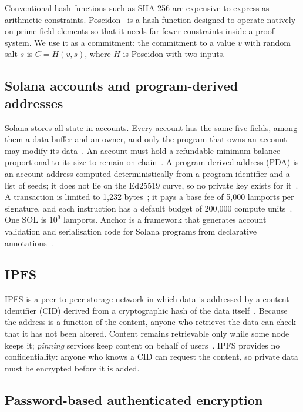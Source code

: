 Conventional hash functions such as SHA-256 are expensive to express as
arithmetic constraints. Poseidon~\cite{grassi2021poseidon} is a hash function
designed to operate natively on prime-field elements so that it needs far
fewer constraints inside a proof system. We use it as a commitment: the
commitment to a value $v$ with random salt $s$ is $C = H(v, s)$, where $H$
is Poseidon with two inputs.

\subsection{Solana accounts and program-derived addresses}

Solana stores all state in accounts. Every account has the same five fields,
among them a data buffer and an owner, and only the program that owns an
account may modify its data~\cite{solana-accounts}. An account must hold a
refundable minimum balance proportional to its size to remain on
chain~\cite{solana-accounts}. A program-derived address (PDA) is an account
address computed deterministically from a program identifier and a list of
seeds; it does not lie on the Ed25519 curve, so no private key exists for
it~\cite{solana-pda}. A transaction is limited to 1{,}232
bytes~\cite{solana-transactions}; it pays a base fee of 5{,}000 lamports per
signature, and each instruction has a default budget of 200{,}000 compute
units~\cite{solana-fees}. One SOL is $10^{9}$ lamports. Anchor is a framework
that generates account validation and serialisation code for Solana programs
from declarative annotations~\cite{anchor-docs}.

\subsection{IPFS}

IPFS is a peer-to-peer storage network in which data is addressed by a
content identifier (CID) derived from a cryptographic hash of the data
itself~\cite{benet2014ipfs,trautwein2022ipfs}. Because the address is a
function of the content, anyone who retrieves the data can check that it has
not been altered. Content remains retrievable only while some node keeps it;
\emph{pinning} services keep content on behalf of
users~\cite{daniel2022ipfs}. IPFS provides no confidentiality: anyone who
knows a CID can request the content, so private data must be encrypted
before it is added.

\subsection{Password-based authenticated encryption}


